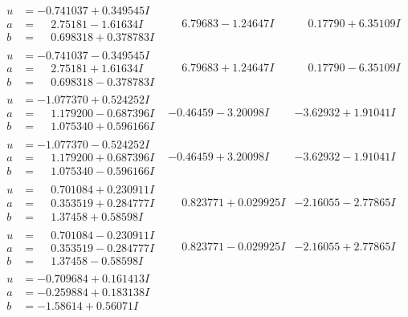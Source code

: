 \documentclass[1p]{elsarticle_modified}
\theoremstyle{definition}
\begin{document}
$$\begin{array}{c|c|c}
\begin{aligned}
u &= -0.741037 + 0.349545 I \\
a &= \phantom{-}2.75181 - 1.61634 I \\
b &= \phantom{-}0.698318 + 0.378783 I\end{aligned}
 & \phantom{-}6.79683 - 1.24647 I & \phantom{-}0.17790 + 6.35109 I \\ \hline\begin{aligned}
u &= -0.741037 - 0.349545 I \\
a &= \phantom{-}2.75181 + 1.61634 I \\
b &= \phantom{-}0.698318 - 0.378783 I\end{aligned}
 & \phantom{-}6.79683 + 1.24647 I & \phantom{-}0.17790 - 6.35109 I \\ \hline\begin{aligned}
u &= -1.077370 + 0.524252 I \\
a &= \phantom{-}1.179200 - 0.687396 I \\
b &= \phantom{-}1.075340 + 0.596166 I\end{aligned}
 & -0.46459 - 3.20098 I & -3.62932 + 1.91041 I \\ \hline\begin{aligned}
u &= -1.077370 - 0.524252 I \\
a &= \phantom{-}1.179200 + 0.687396 I \\
b &= \phantom{-}1.075340 - 0.596166 I\end{aligned}
 & -0.46459 + 3.20098 I & -3.62932 - 1.91041 I \\ \hline\begin{aligned}
u &= \phantom{-}0.701084 + 0.230911 I \\
a &= \phantom{-}0.353519 + 0.284777 I \\
b &= \phantom{-}1.37458 + 0.58598 I\end{aligned}
 & \phantom{-}0.823771 + 0.029925 I & -2.16055 - 2.77865 I \\ \hline\begin{aligned}
u &= \phantom{-}0.701084 - 0.230911 I \\
a &= \phantom{-}0.353519 - 0.284777 I \\
b &= \phantom{-}1.37458 - 0.58598 I\end{aligned}
 & \phantom{-}0.823771 - 0.029925 I & -2.16055 + 2.77865 I \\ \hline\begin{aligned}
u &= -0.709684 + 0.161413 I \\
a &= -0.259884 + 0.183138 I \\
b &= -1.58614 + 0.56071 I\end{aligned}

\end{array}$$
\end{document}
